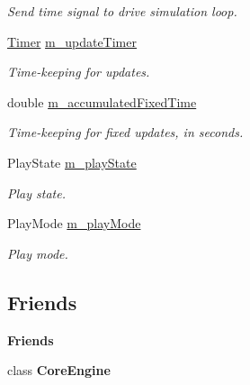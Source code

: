 \begin{Indent}
\begin{DoxyCompactItemize}
\begin{DoxyCompactList}\small\item\em Send time signal to drive simulation loop. \end{DoxyCompactList}\item 
\mbox{\label{classrev_1_1_simulation_loop_a02f1a2839740c10a3d751ba868da37da}} 
\mbox{\hyperlink{classrev_1_1_timer}{Timer}} \mbox{\hyperlink{classrev_1_1_simulation_loop_a02f1a2839740c10a3d751ba868da37da}{m\+\_\+update\+Timer}}
\begin{DoxyCompactList}\small\item\em Time-\/keeping for updates. \end{DoxyCompactList}\item 
\mbox{\label{classrev_1_1_simulation_loop_a284e0aa33afb57d1f099363a8a9b93f3}} 
double \mbox{\hyperlink{classrev_1_1_simulation_loop_a284e0aa33afb57d1f099363a8a9b93f3}{m\+\_\+accumulated\+Fixed\+Time}}
\begin{DoxyCompactList}\small\item\em Time-\/keeping for fixed updates, in seconds. \end{DoxyCompactList}\item 
\mbox{\label{classrev_1_1_simulation_loop_af06d5d1c56df707130e0747ccd87a421}} 
Play\+State \mbox{\hyperlink{classrev_1_1_simulation_loop_af06d5d1c56df707130e0747ccd87a421}{m\+\_\+play\+State}}
\begin{DoxyCompactList}\small\item\em Play state. \end{DoxyCompactList}\item 
\mbox{\label{classrev_1_1_simulation_loop_adfa6893595279e3dd172495e70decd22}} 
Play\+Mode \mbox{\hyperlink{classrev_1_1_simulation_loop_adfa6893595279e3dd172495e70decd22}{m\+\_\+play\+Mode}}
\begin{DoxyCompactList}\small\item\em Play mode. \end{DoxyCompactList}\end{DoxyCompactItemize}
\end{Indent}
\subsection*{Friends}
\begin{Indent}\textbf{ Friends}\par
\begin{DoxyCompactItemize}
\item 
\mbox{\label{classrev_1_1_simulation_loop_a7e7bd315086595dcbf3d7e324381323e}} 
class {\bfseries Core\+Engine}
\end{DoxyCompactItemize}
\end{Indent}
